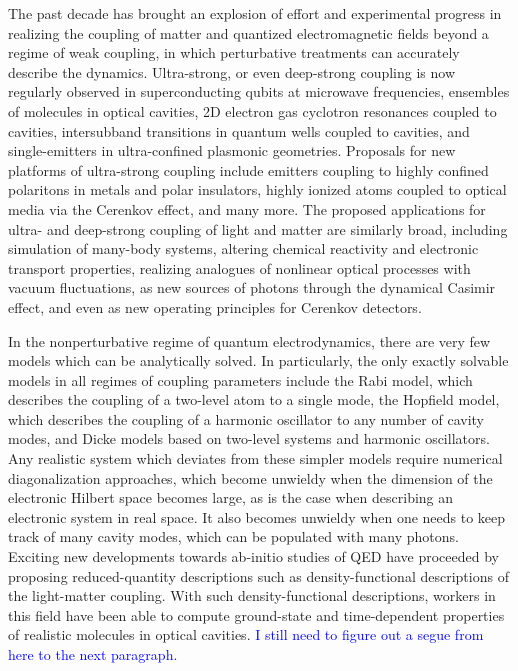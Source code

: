 \documentclass[aps,prb,twocolumn,
	groupedaddress,superscriptaddress,
	amsfonts,amssymb,amsmath,floatfix,
	citeautoscript]{revtex4-1}
\begin{document}
The past decade has brought an explosion of effort and experimental progress in realizing the coupling of matter and quantized electromagnetic fields beyond a regime of weak coupling, in which perturbative treatments can accurately describe the dynamics. Ultra-strong, or even deep-strong coupling is now regularly observed in superconducting qubits at microwave frequencies, ensembles of molecules in optical cavities, 2D electron gas cyclotron resonances coupled to cavities, intersubband transitions in quantum wells coupled to cavities, and single-emitters in ultra-confined plasmonic geometries. Proposals for new platforms of ultra-strong coupling include emitters coupling to highly confined polaritons in metals and polar insulators, highly ionized atoms coupled to optical media via the Cerenkov effect, and many more. The proposed applications for ultra- and deep-strong coupling of light and matter are similarly broad, including simulation of many-body systems, altering chemical reactivity and electronic transport properties, realizing analogues of nonlinear optical processes with vacuum fluctuations, as new sources of photons through the dynamical Casimir effect, and even as new operating principles for Cerenkov detectors.

In the nonperturbative regime of quantum electrodynamics, there are very few models which can be analytically solved. In particularly, the only exactly solvable models in all regimes of coupling parameters include the Rabi model, which describes the coupling of a two-level atom to a single mode, the Hopfield model, which describes the coupling of a harmonic oscillator to any number of cavity modes, and Dicke models based on two-level systems and harmonic oscillators. Any realistic system which deviates from these simpler models require numerical diagonalization approaches, which become unwieldy when the dimension of the electronic Hilbert space becomes large, as is the case when describing an electronic system in real space. It also becomes unwieldy when one needs to keep track of many cavity modes, which can be populated with many photons. Exciting new developments towards ab-initio studies of QED have proceeded by proposing reduced-quantity descriptions such as density-functional descriptions of the light-matter coupling. With such density-functional descriptions, workers in this field have been able to compute ground-state and time-dependent properties of realistic molecules in optical cavities. \textcolor{blue}{I still need to figure out a segue from here to the next paragraph.}
\end{document}
